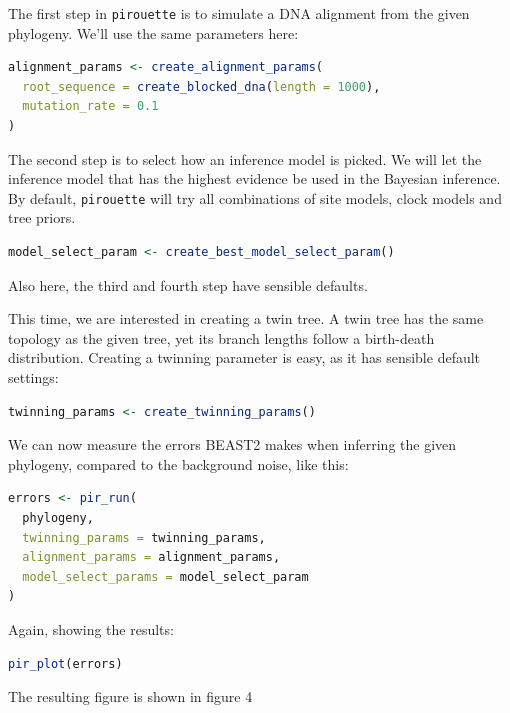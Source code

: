 \documentclass{article}
\begin{document}
The first step in \verb;pirouette; is to simulate a DNA alignment from the 
given phylogeny. We'll use the same parameters here:

\begin{lstlisting}[language=R, floatplacement=H]
alignment_params <- create_alignment_params(
  root_sequence = create_blocked_dna(length = 1000),
  mutation_rate = 0.1
)
\end{lstlisting}

The second step is to select how an inference model is picked.
We will let the inference model that has the highest evidence be used
in the Bayesian inference. By default, \verb;pirouette; will try
all combinations of site models, clock models and tree priors.

\begin{lstlisting}[language=R, floatplacement=H]
model_select_param <- create_best_model_select_param()
\end{lstlisting}

Also here, the third and fourth step have sensible defaults. 

This time, we are interested in creating a twin tree. A twin tree
has the same topology as the given tree, yet its branch lengths follow
a birth-death distribution. Creating a twinning parameter is easy,
as it has sensible default settings:

\begin{lstlisting}[language=R, floatplacement=H]
twinning_params <- create_twinning_params()
\end{lstlisting}


We can now measure the errors BEAST2
makes when inferring the given phylogeny, compared
to the background noise, like this:

\begin{lstlisting}[language=R, floatplacement=H]
errors <- pir_run(
  phylogeny,
  twinning_params = twinning_params,
  alignment_params = alignment_params,
  model_select_params = model_select_param
)
\end{lstlisting}

Again, showing the results:

\begin{lstlisting}[language=R, floatplacement=H]
pir_plot(errors)
\end{lstlisting}

The resulting figure is shown in figure 4
\end{document}
